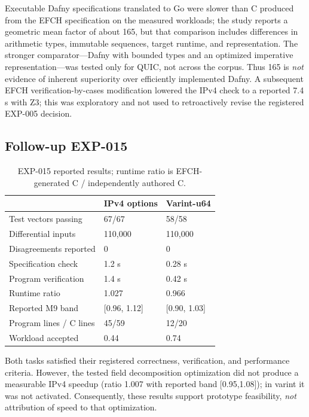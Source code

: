 \documentclass[10pt,twocolumn]{article}
\begin{document}
Executable Dafny specifications translated to Go were slower than C produced from the EFCH specification on the measured workloads; the study reports a geometric mean factor of about 165, but that comparison includes differences in arithmetic types, immutable sequences, target runtime, and representation. The stronger comparator---Dafny with bounded types and an optimized imperative representation---was tested only for QUIC, not across the corpus. Thus 165 is \emph{not} evidence of inherent superiority over efficiently implemented Dafny. A subsequent EFCH verification-by-cases modification lowered the IPv4 check to a reported 7.4 s with Z3; this was exploratory and not used to retroactively revise the registered EXP-005 decision.

\subsection{Follow-up EXP-015}
\begin{table}[t]
\centering\small
\caption{EXP-015 reported results; runtime ratio is EFCH-generated C / independently authored C.}\label{tab:exp015}
\begin{tabularx}{\columnwidth}{@{}p{}XX@{}}
\toprule & IPv4 options & Varint-u64 \\ \midrule
Test vectors passing & 67/67 & 58/58 \\
Differential inputs & 110,000 & 110,000 \\
Disagreements reported & 0 & 0 \\
Specification check & 1.2 s & 0.28 s \\
Program verification & 1.4 s & 0.42 s \\
Runtime ratio & 1.027 & 0.966 \\
Reported M9 band & [0.96, 1.12] & [0.90, 1.03] \\
Program lines / C lines & 45/59 & 12/20 \\
Workload accepted & 0.44 & 0.74 \\
\bottomrule
\end{tabularx}
\end{table}

Both tasks satisfied their registered correctness, verification, and performance criteria. However, the tested field decomposition optimization did not produce a measurable IPv4 speedup (ratio 1.007 with reported band [0.95,1.08]); in varint it was not activated. Consequently, these results support prototype feasibility, \emph{not} attribution of speed to that optimization.
\end{document}

